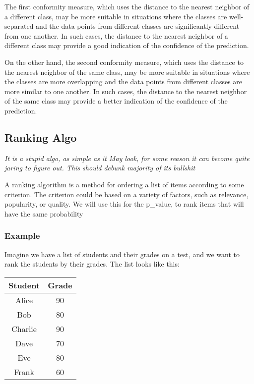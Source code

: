 The first conformity measure, which uses the distance to the nearest neighbor of a different class, may be more suitable in situations where the classes are well-separated and the data points from different classes are significantly different from one another. In such cases, the distance to the nearest neighbor of a different class may provide a good indication of the confidence of the prediction.

On the other hand, the second conformity measure, which uses the distance to the nearest neighbor of the same class, may be more suitable in situations where the classes are more overlapping and the data points from different classes are more similar to one another. In such cases, the distance to the nearest neighbor of the same class may provide a better indication of the confidence of the prediction.

\subsection{Ranking Algo}
\textit{It is a stupid algo, as simple as it May look, for some reason it can become quite jaring to figure out. This should debunk majority of its bullshit}

\begin{definition}
	A ranking algorithm is a method for ordering a list of items according to some criterion. The criterion could be based on a variety of factors, such as relevance, popularity, or quality.
	We will use this for the p\_value, to rank items that will have the same probability
\end{definition}

\subsubsection{Example}
Imagine we have a list of students and their grades on a test, and we want to rank the students by their grades. The list looks like this:
\begin{center}
	\begin{tabular}{ |c| c| }
		\hline
		Student & Grade \\
		\hline
		Alice   & 90    \\
		Bob     & 80    \\
		Charlie & 90    \\
		Dave    & 70    \\
		Eve     & 80    \\
		Frank   & 60    \\

		\hline
	\end{tabular}
\end{center}

